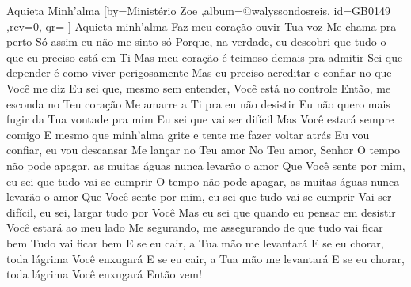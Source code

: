 \beginsong
{Aquieta Minh'alma %
}[by={Ministério Zoe %
},album={@walyssondosreis},
id={GB0149 %
},rev={0}, %
qr={ %
}]
\beginchorus
Aquieta minh'alma
Faz meu coração ouvir Tua voz
Me chama pra perto
Só assim eu não me sinto só
\endchorus
\beginverse*
Porque, na verdade, eu descobri que tudo o que eu preciso está em Ti
Mas meu coração é teimoso demais pra admitir
Sei que depender é como viver perigosamente
Mas eu preciso acreditar e confiar no que Você me diz
\endverse
\beginverse*
Eu sei que, mesmo sem entender, Você está no controle
Então, me esconda no Teu coração
Me amarre a Ti pra eu não desistir
\endverse
\beginverse*
Eu não quero mais fugir da Tua vontade pra mim
Eu sei que vai ser difícil
Mas Você estará sempre comigo
\endverse
\beginverse*
E mesmo que minh'alma grite e tente me fazer voltar atrás
Eu vou confiar, eu vou descansar
Me lançar no Teu amor
No Teu amor, Senhor
\endverse
\beginverse*
O tempo não pode apagar, as muitas águas nunca levarão o amor
Que Você sente por mim, eu sei que tudo vai se cumprir
O tempo não pode apagar, as muitas águas nunca levarão o amor
Que Você sente por mim, eu sei que tudo vai se cumprir
\endverse
\beginverse*
Vai ser difícil, eu sei, largar tudo por Você
Mas eu sei que quando eu pensar em desistir
Você estará ao meu lado
Me segurando, me assegurando de que tudo vai ficar bem
Tudo vai ficar bem
\endverse
\beginverse*
E se eu cair, a Tua mão me levantará
E se eu chorar, toda lágrima Você enxugará
E se eu cair, a Tua mão me levantará
E se eu chorar, toda lágrima Você enxugará
Então vem!
\endverse
\vspace{4em} %
\begin{comment}
\lstset{basicstyle=\scriptsize\bf} %
\tab{Solo 1}
\begin{lstlisting}
E|-----------------------------------------------------|
B|-----------------------------------------------------|
G|-----------------------------------------------------|
D|-----------------------------------------------------|
A|-----------------------------------------------------|
E|-----------------------------------------------------|
\end{lstlisting}
\end{comment}
 
